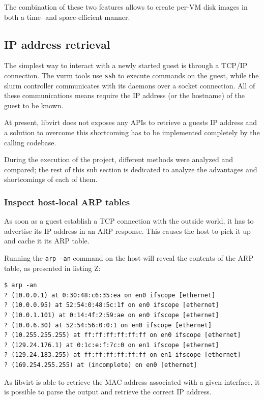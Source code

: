 The combination of these two features allows to create per-VM disk images in both a time- and space-efficient manner.

\subsection{IP address retrieval}

The simplest way to interact with a newly started guest is through a TCP/IP connection. The vurm tools use \texttt{ssh} to execute commands on the guest, while the slurm controller communicates with its daemons over a socket connection. All of these communications means require the IP address (or the hostname) of the guest to be known.

At present, libvirt does not exposes any APIs to retrieve a guests IP address and a solution to overcome this shortcoming has to be implemented completely by the calling codebase.

During the execution of the project, different methods were analyzed and compared; the rest of this sub section is dedicated to analyze the advantages and shortcomings of each of them.


\subsubsection{Inspect host-local ARP tables}

As soon as a guest establish a TCP connection with the outside world, it has to advertise its IP address in an ARP response. This causes the host to pick it up and cache it its ARP table.

Running the \texttt{arp -an} command on the host will reveal the contents of the ARP table, as presented in listing Z:

\begin{lstlisting}
$ arp -an
? (10.0.0.1) at 0:30:48:c6:35:ea on en0 ifscope [ethernet]
? (10.0.0.95) at 52:54:0:48:5c:1f on en0 ifscope [ethernet]
? (10.0.1.101) at 0:14:4f:2:59:ae on en0 ifscope [ethernet]
? (10.0.6.30) at 52:54:56:0:0:1 on en0 ifscope [ethernet]
? (10.255.255.255) at ff:ff:ff:ff:ff:ff on en0 ifscope [ethernet]
? (129.24.176.1) at 0:1c:e:f:7c:0 on en1 ifscope [ethernet]
? (129.24.183.255) at ff:ff:ff:ff:ff:ff on en1 ifscope [ethernet]
? (169.254.255.255) at (incomplete) on en0 [ethernet]
\end{lstlisting}

As libvirt is able to retrieve the MAC address associated with a given interface, it is possible to parse the output and retrieve the correct IP address.

